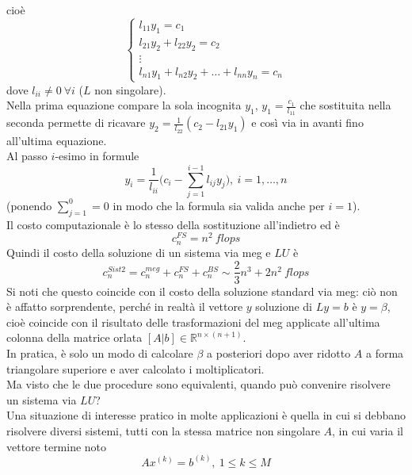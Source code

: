 cioè
\begin{equation*}
    \begin{cases}
    l_{11}y_1 = c_1\\ 
    l_{21}y_2 + l_{22}y_2 = c_2 \\ 
    \vdots\\ 
    l_{n1}y_1 +l_{n2}y_2 + \dots + l_{nn}y_{n} = c_n
\end{cases}
\end{equation*}
dove $l_{ii}\neq 0 \ \forall i$ ($L$ non singolare). \\
Nella prima equazione compare la sola incognita $y_1$, $y_1 = \frac{c_1}{l_11}$ che sostituita nella seconda permette di ricavare $y_2=\frac{1}{l_{22}}(c_2 - l_{21}y_1)$ e così via in avanti fino all'ultima equazione. \\
Al passo $i$-esimo in formule
\begin{equation*}
    y_i = \frac{1}{l_{ii}}\biggl( c_i - \sum_{j=1}^{i-1} l_{ij}y_j \biggr), \ i=1,\dots,n
\end{equation*}
(ponendo $\sum_{j=1}^0 = 0$ in modo che la formula sia valida anche per $i=1$).\\
Il costo computazionale è lo stesso della sostituzione all'indietro ed è 
\begin{equation*}
    c_n^{FS} = n^2 \ flops
\end{equation*}
Quindi il costo della soluzione di un sistema via meg e $LU$ è 
\begin{equation*}
    c_n^{Sist2} = c_n^{meg} + c_n^{FS} + c_n^{BS} \sim \frac{2}{3}n^3 + 2n^2 \ flops
\end{equation*}
Si noti che questo coincide con il costo della soluzione standard via meg: ciò non è affatto sorprendente, perché in realtà il vettore $y$ soluzione di $Ly=b$ è $y=\beta$, cioè coincide con il risultato delle trasformazioni del meg applicate all'ultima colonna della matrice orlata $[A|b]\in \mathbb{R}^{n\times (n+1)}$. \\
In pratica, è solo un modo di calcolare $\beta$ a posteriori dopo aver ridotto $A$ a forma triangolare superiore e aver calcolato i moltiplicatori.\\
Ma visto che le due procedure sono equivalenti, quando può convenire risolvere un sistema via $LU$? \\
Una situazione di interesse pratico in molte applicazioni è quella in cui si debbano risolvere diversi sistemi, tutti con la stessa matrice non singolare $A$, in cui varia il vettore termine noto
\begin{equation*}
    Ax^{(k)} = b^{(k)}, \ 1 \leq k \leq M
\end{equation*}
